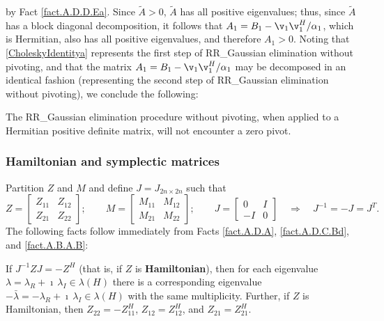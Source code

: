 by Fact \ref{fact.A.D.D.Ea}.  Since $\tilde A>0$, $\tilde A$ has all positive eigenvalues; thus, since $\tilde A$ has a block diagonal decomposition,
it follows that $A_1=B_1-\v_1 \v_1^H/ \alpha_1$, which is Hermitian, also has all positive eigenvalues, and therefore $A_1>0$.  Noting that \eqref{CholeskyIdentitya}
represents the first step of RR_Gaussian elimination without pivoting, and that the matrix $A_1=B_1-\v_1 \v_1^H/ \alpha_1$ may be decomposed in an identical fashion (representing
the second step of RR_Gaussian elimination without pivoting), we conclude the following:

\begin{fact} \label{fact.A.D.D.Eg}
The RR_Gaussian elimination procedure without pivoting, when applied to a Hermitian positive definite matrix, will not encounter a zero pivot.
\end{fact}

\subsubsection{Hamiltonian and symplectic matrices} \label{sec.A.D.D.B}

Partition $Z$ and $M$ and define $J=J_{2n\times 2n}$ such that
\begin{equation*}
Z = \begin{bmatrix} Z_{11} & Z_{12} \\ Z_{21} & Z_{22} \end{bmatrix}; \qquad
M = \begin{bmatrix} M_{11} & M_{12} \\ M_{21} & M_{22} \end{bmatrix}; \qquad
J = \begin{bmatrix} 0 & I \\ -I & 0 \end{bmatrix} \quad \Rightarrow \quad J^{-1} = - J = J^T.
\end{equation*}
The following facts follow immediately from Facts \ref{fact.A.D.A}, \ref{fact.A.D.C.Bd}, and \ref{fact.A.B.A.B}:

\begin{fact} \label{fact.A.D.D.Ec}
If $J^{-1} Z J = -Z^H$ (that is, if $Z$ is {\bf Hamiltonian}),
then for each eigenvalue $\lambda= \lambda_{R}+\imath\,\lambda_{I} \in \lambda(H)$
there is a corresponding eigenvalue $-\bar\lambda = -\lambda_{R}+\imath\,\lambda_{I} \in \lambda(H)$
with the same multiplicity.  Further, if $Z$ is Hamiltonian, then $Z_{22}=-Z_{11}^H$, $Z_{12}=Z_{12}^H$, and $Z_{21}=Z_{21}^H$.
\end{fact}

